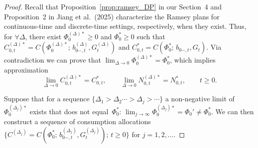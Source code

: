 \documentclass[12pt]{article}
\begin{document}
{{{\begin{proof}
Recall that Proposition~\ref{prop:ramsey_DP} in our Section~4 and Proposition~2 in Jiang et al.\ (2025) characterize the Ramsey plans for continuous-time and discrete-time settings, respectively, when they exist. Thus, for $\forall \Delta$, there exist $\Phi_0^{(\Delta)*} \ge 0$ and $\Phi_0^* \ge 0$ such that $C_{0,t}^{(\Delta)*} = C(\Phi_0^{(\Delta)*};\, b_{0-,t}^{(\Delta)}, G_t^{(\Delta)})$ and $C_{0,t}^* = C(\Phi_0^*;\, b_{0-,t}, G_t)$. Via contradiction we can prove that $\lim_{\Delta \to 0} \Phi_0^{(\Delta)*} = \Phi_0^*$, which implies approximation
\begin{equation}\label{eq:A9}
\lim_{\Delta \to 0} C_{0,t}^{(\Delta)*} = C_{0,t}^*, \qquad \lim_{\Delta \to 0} N_{0,t}^{(\Delta)*} = N_{0,t}^*, \qquad t \ge 0.
\end{equation}

Suppose that for a sequence $\{\Delta_1 > \Delta_2 \cdots > \Delta_j > \cdots\}$ a non-negative limit of $\Phi_0^{(\Delta_j)*}$ exists that does not equal~$\Phi_0^*$: $\lim_{j \to \infty} \Phi_0^{(\Delta_j)*} = \Phi_0' \ne \Phi_0^*$. We can then construct a sequence of consumption allocations $\{C^{(\Delta_j)} = C(\Phi_0^*;\, b_{0-,t}^{(\Delta_j)}, G_t^{(\Delta_j)});\, t \ge 0\}$ for $j = 1, 2, \ldots$.


\end{proof}}}}
\end{document}
